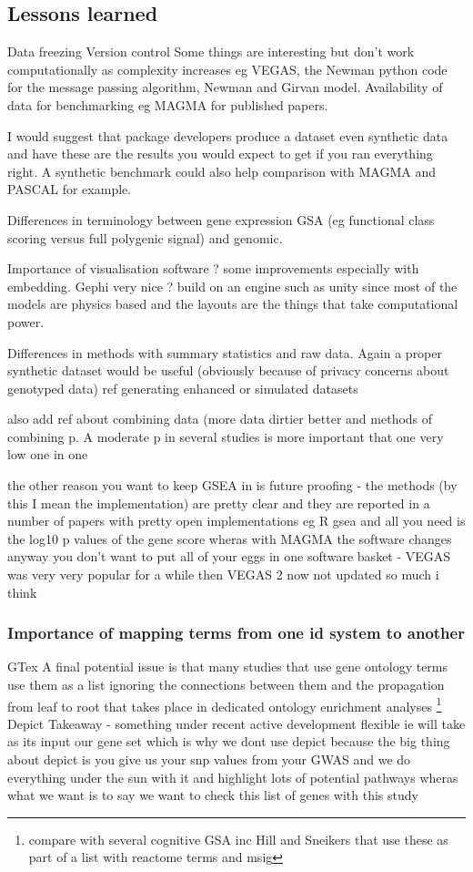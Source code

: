  \subsection{Lessons learned}
 Data freezing
 Version control 
 Some things are interesting but don't work computationally as complexity increases eg VEGAS, the Newman python code for the message passing algorithm, Newman and Girvan model. 
 Availability of data for benchmarking eg MAGMA for published papers. 
 
 I would suggest that package developers produce a dataset even synthetic data and have these are the results you would expect to get if you ran everything right. A synthetic benchmark could also help comparison with MAGMA and PASCAL for example. 
 
 Differences in terminology between gene expression GSA (eg functional class scoring versus full polygenic signal) and genomic. 
 
 Importance of visualisation software ? some improvements especially with embedding. Gephi very nice ? build on an engine such as unity since most of the models are physics based and the layouts are the things that take computational power.
 
 Differences in methods with summary statistics and raw data. Again a proper synthetic dataset would be useful (obviously because of privacy concerns about genotyped data) ref generating enhanced or simulated datasets 
 
 also add ref about combining data (more data dirtier better  and methods of combining p. A moderate p in several studies is more important that one very low one in one
 
 the other reason you want to keep GSEA in is future proofing - the methods (by this I mean the implementation) are pretty clear and they are reported in a number of papers with pretty open implementations eg R gsea and all you need is the log10 p values of the gene score wheras with MAGMA the software changes anyway you don't want to put all of your eggs in one software basket - VEGAS was very very popular for a while then VEGAS 2 now not updated so much i think
  \subsubsection{Importance of mapping terms from one id system to another}
 GTex
 A final potential issue is that many studies that use gene ontology terms use them as a list ignoring the connections between them and the propagation from leaf to root that takes place in dedicated ontology enrichment analyses \cite{rhee2008use}\cite{mi2019protocol} \footnote{compare with several cognitive GSA inc Hill and Sneikers that use these as part of a list with reactome terms and msig}
 Depict
Takeaway - something under recent active development flexible ie will take as its input our gene set which is why we dont use depict because the big thing about depict is you give us your snp values from your GWAS and we do everything under the sun with it and highlight lots of potential pathways wheras what we want is to say we want to check this list of genes with this study 
